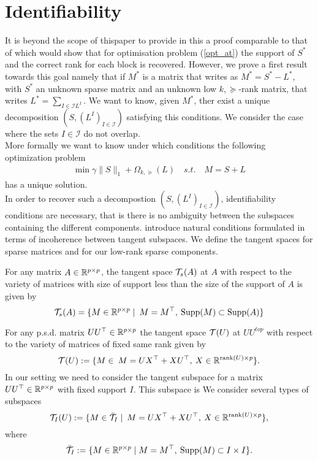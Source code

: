 \section{Identifiability}
\label{sec:id}
It is beyond the scope of thispaper to provide in this a proof comparable to that of \citet{chandrasekaran2010} which would show that for optimisation problem (\ref{opt_at}) the support of $S^*$ and the correct rank for each block is recovered. However, we prove a first result towards this goal namely that if  $M^{\ast}$ is a matrix that writes as  $M^{\ast}= S^{\ast}-L^{\ast}$, with $S^{\ast}$ an unknown sparse matrix and an unknown  low $k,\succeq$-rank matrix, that writes  $L^{\ast}=\sum_{I\in\mathcal{I}L^{I}}$. We want to know, given $M^{\ast}$, ther exist a unique decomposition $\left(S,(L^{I})_{I\in\mathcal{I}}\right)$ satisfying this conditions. We consider the case where the sets $I\in\mathcal{I}$ do not overlap.  \\

More formally we want to know under which conditions the following optimization problem 
\begin{align}
\min \gamma\|S\|_1+\Omega_{k,\succeq}(L) \quad s.t. \quad M=S+L
\end{align}
has a unique solution.\\

In order to recover such a decompostion  $\left(S,(L^{I})_{I\in\mathcal{I}}\right)$, identifiability conditions are necessary, that is there is no ambiguity between the subspaces containing the different components.  \citet{chandrasekaran2011rank} introduce natural conditions formulated in terms of incoherence between tangent subspaces. We define the tangent spaces for sparse matrices and for our low-rank sparse components.

For any matrix $A\in\mathbb{R}^{p\times p}$, the tangent space $\mathcal{T}_s(A)$ at $A$ with respect to the variety of matrices with size of support less than the size of the support of $A$ is given by
$$
\mathcal{T}_s(A)=\{M \in \mathbb{R}^{p \times p}\mid  \: M=M^\top, \: {\rm Supp}(M)\subset {\rm Supp}(A)\}
$$

For any p.s.d. matrix $UU^{\top}\in\mathbb{R}^{p\times p}$  the tangent space $\mathcal{T}(U)$ at $UU^{top}$ with respect to the variety of matrices of fixed same rank given by
$$
\mathcal{T}(U):=\{M \in \: M=UX^\top+XU^\top,\: X \in \mathbb{R}^{\text{rank}(U) \times p} \}.
$$
In our setting we need to consider the tangent subspace for a matrix $UU^{\top}\in\mathbb{R}^{p\times p}$ with fixed support $I$. This subspace is
We consider several types of subspaces
$$\mathcal{T}_I(U):=\{M \in \bar{\mathcal{T}}_I\mid \: M=UX^\top+XU^\top,\: X \in \mathbb{R}^{\text{rank}(U) \times p} \},$$
where 
$$
\bar{\mathcal{T}}_I:=\{M \in \mathbb{R}^{p \times p}\mid  M=M^\top, \: {\rm Supp}(M)\subset I \times I\}.
$$

